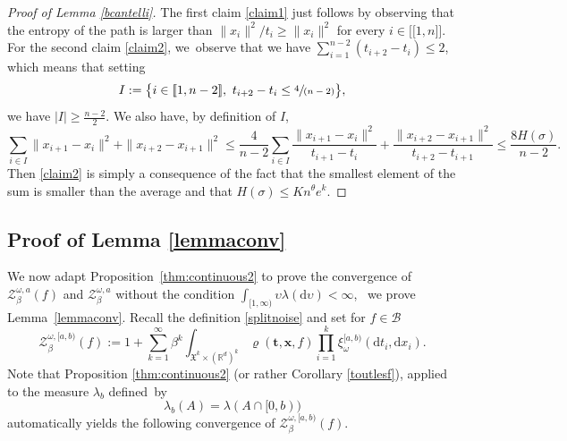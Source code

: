 \documentclass[JEP,XML,SOM,Unicode,published]{cedram}
\let\mathcal\mathscr
\newcommand{\spfrac}[2]{\sfrac{#1}{(#2)}}
\newcommand{\lint}{\mathopen{[\![}}
\newcommand{\rint}{\mathclose{]\!]}}
\theoremstyle{definition}
\newcommand{\bt}{\boldsymbol{t}}
\newcommand{\bx}{\boldsymbol{x}}
\newcommand{\dd}{\mathrm{d}}
\newcommand{\cB}{{\ensuremath{\mathcal B}} }
\newcommand{\cZ}{{\ensuremath{\mathcal Z}} }
\newcommand{\bbR}{{\ensuremath{\mathbb R}} }
\let\gb\beta
\let\gl\lambda
\let\ups\upsilon
\let\go\omega
\begin{document}
\begin{proof}[Proof of Lemma \ref{bcantelli}]
The first claim \eqref{claim1} just follows by observing that the entropy of the path is
larger than $\|x_i\|^2/t_i \ge \|x_i\|^2$ for every $i\in \lint 1, n\rint$.
For the second claim \eqref{claim2}, we~observe that
we have
$\sum_{i=1}^{n-2}(t_{i+2}-t_i)\le 2$,
which means that setting
\[
I:= \bigl\{ i\in \lint 1,n-2\rint, \ t_{i+2}-t_i\le \spfrac{4 }{n-2} \bigr\},
\]
we have $|I|\ge \frac{n-2}{2}$. We also have, by definition of $I$,
\begin{equation*}
\sum_{i\in I} \|x_{i+1}-x_i \|^2+\|x_{i+2}-x_{i+1}\|^2\le \frac{4 }{n-2}
\sum_{i\in I}\frac{\|x_{i+1}-x_i\|^2}{t_{i+1}-t_i}+\frac{\|x_{i+2}-x_{i+1}\|^2}{t_{i+2} -t_{i+1}}
\le \frac{8 H(\sigma) }{n-2}.
\end{equation*}
Then \eqref{claim2} is simply a consequence of the fact that
the smallest element of the sum is smaller than the average
and that $H(\sigma) \leq K n^{\theta} e^k$.
\end{proof}

\subsection{Proof of Lemma \ref{lemmaconv}}
\label{sec:lemmaconv}

We now adapt Proposition~\ref{thm:continuous2}
to prove the convergence of $\cZ_{\gb}^{\go,a}(f)$ and $\cZ_{\gb}^{\go,a}$
without the condition $\int_{[1,\infty)} \ups \lambda(\dd \ups) <\infty$, \ie ~we prove Lemma~\ref{lemmaconv}.
Recall the definition \eqref{splitnoise}
and set for $f\in \cB$
\begin{equation}\label{trunkaparti}
\cZ^{\go,[a,b)}_{\beta}(f):=1+\sum_{k=1}^\infty \beta^k\int_{ \mathfrak{X}^k \times (\bbR^d)^k} \varrho(\bt, \bx, f) \prod_{i=1}^k \xi^{[a,b)}_{\go} (\dd t_i, \dd x_i).
\end{equation}
Note that Proposition \ref{thm:continuous2} (or rather Corollary \ref{toutlesf}), applied to the measure $\gl_b$ defined~by
\begin{equation}\label{glbdef}
\gl_b(A)=\gl(A\cap[0,b))
\end{equation}
automatically yields the following convergence of $\cZ^{\go,[a,b)}_{\beta}(f)$.
\end{document}
